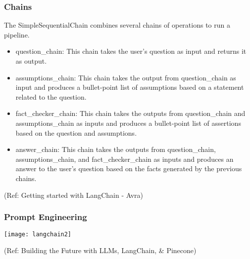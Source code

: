 \begin{frame}\frametitle{Chains}

The SimpleSequentialChain combines several chains of operations to run a pipeline. 

\begin{itemize}
\item question\_chain: This chain takes the user's question as input and returns it as output. 
\item assumptions\_chain: This chain takes the output from question\_chain as input and produces a bullet-point list of assumptions based on a statement related to the question. 
\item fact\_checker\_chain: This chain takes the outputs from question\_chain and assumptions\_chain as inputs and produces a bullet-point list of assertions based on the question and assumptions.
\item answer\_chain: This chain takes the outputs from question\_chain, assumptions\_chain, and fact\_checker\_chain as inputs and produces an answer to the user's question based on the facts generated by the previous chains.
\end{itemize}


{\tiny (Ref: Getting started with LangChain - Avra)}
\end{frame}


\begin{frame}\frametitle{Prompt Engineering}

\begin{center}
\texttt{[image: langchain2]}
\end{center}	  

{\tiny (Ref: Building the Future with LLMs, LangChain, \& Pinecone)}
\end{frame}

